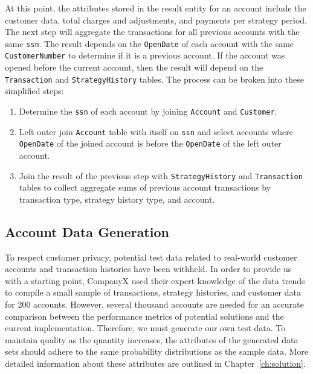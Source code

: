 At this point, the attributes stored in the result entity for an account include the customer data, total charges and adjustments, and payments per
strategy period. The next step will aggregate the transactions for all previous accounts with the same \texttt{ssn}. The result depends on the \texttt{OpenDate} of each account with the same \texttt{CustomerNumber} to determine if it is a previous account. If the account was opened before the
current account, then the result will depend on the \texttt{Transaction} and \texttt{StrategyHistory} tables. The process can be broken into these simplified steps:
\begin{enumerate}
 \item Determine the \texttt{ssn} of each account by joining \texttt{Account} and \texttt{Customer}.
 \item Left outer join \texttt{Account} table with itself on \texttt{ssn} and select accounts where \texttt{OpenDate} of the joined account is before the \texttt{OpenDate} of the left outer account.
 \item Join the result of the previous step with \texttt{StrategyHistory} and \texttt{Transaction} tables to collect aggregate sums of previous account
  transactions by transaction type, strategy history type, and account.
\end{enumerate}

\subsection{Account Data Generation}
To respect customer privacy, potential test data related to real-world customer accounts and transaction histories have been withheld. In order to provide us with a starting point, CompanyX used their expert knowledge of the data trends to compile a small sample of transactions, strategy histories, and customer data for 200 accounts. However, several thousand accounts are needed for an accurate comparison between the performance metrics of potential solutions and the current implementation. Therefore, we must generate our own test data. To maintain quality as the quantity increases,
the attributes of the generated data sets should adhere to the same probability distributions as the sample data. More detailed information about these
attributes are outlined in Chapter~\ref{ch:solution}.

